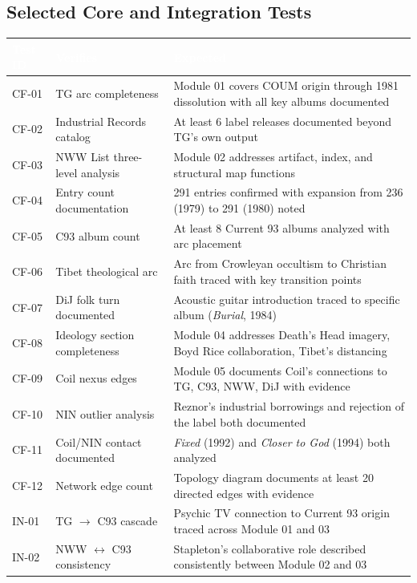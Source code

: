 \documentclass[11pt,letterpaper]{article}
\newcommand{\tableheader}[1]{\textbf{\sffamily\textcolor{white}{#1}}}
\begin{document}
\subsection{Selected Core and Integration Tests}

\begin{center}
\begin{tabularx}{\textwidth}{L{1.5cm}L{5cm}X}
\toprule
{}
\tableheader{Test ID} & \tableheader{Verifies} & \tableheader{Expected} \\
\midrule
CF-01 & TG arc completeness & Module 01 covers COUM origin through 1981 dissolution with all key albums documented \\
CF-02 & Industrial Records catalog & At least 6 label releases documented beyond TG's own output \\
CF-03 & NWW List three-level analysis & Module 02 addresses artifact, index, and structural map functions \\
CF-04 & Entry count documentation & 291 entries confirmed with expansion from 236 (1979) to 291 (1980) noted \\
CF-05 & C93 album count & At least 8 Current 93 albums analyzed with arc placement \\
CF-06 & Tibet theological arc & Arc from Crowleyan occultism to Christian faith traced with key transition points \\
CF-07 & DiJ folk turn documented & Acoustic guitar introduction traced to specific album (\textit{Burial}, 1984) \\
CF-08 & Ideology section completeness & Module 04 addresses Death's Head imagery, Boyd Rice collaboration, Tibet's distancing \\
CF-09 & Coil nexus edges & Module 05 documents Coil's connections to TG, C93, NWW, DiJ with evidence \\
CF-10 & NIN outlier analysis & Reznor's industrial borrowings and rejection of the label both documented \\
CF-11 & Coil/NIN contact documented & \textit{Fixed} (1992) and \textit{Closer to God} (1994) both analyzed \\
CF-12 & Network edge count & Topology diagram documents at least 20 directed edges with evidence \\
IN-01 & TG $\to$ C93 cascade & Psychic TV connection to Current 93 origin traced across Module 01 and 03 \\
IN-02 & NWW $\leftrightarrow$ C93 consistency & Stapleton's collaborative role described consistently between Module 02 and 03 \\

\end{tabularx}
\end{center}
\end{document}
